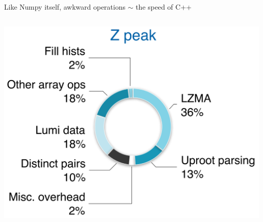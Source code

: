 \documentclass[aspectratio=169]{beamer}
\begin{document}
\begin{frame}{Like Numpy itself, awkward operations $\sim$ the speed of C++}
\begin{columns}
\includegraphics[width=\linewidth]{zpeak-performance-breakdown.png}
\end{columns}
\end{frame}
\end{document}
